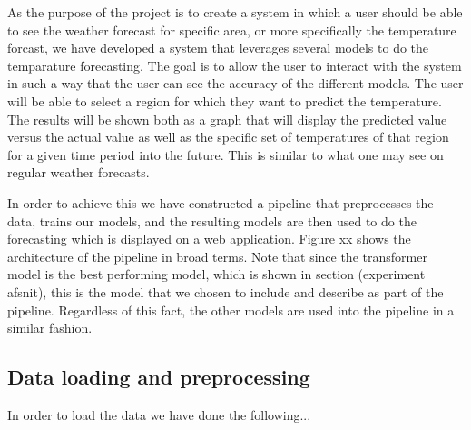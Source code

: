 As the purpose of the project is to create a system in which a user should be able to see the weather forecast for specific area, or more specifically the temperature forcast, we have developed a system that leverages several models to do the temparature forecasting. 
The goal is to allow the user to interact with the system in such a way that the user can see the accuracy of the different models. 
The user will be able to select a region for which they want to predict the temperature. The results will be shown both as a graph that will display the predicted value versus the actual value as well as the specific set of temperatures of that region for a given time period into the future. This is similar to what one may see on regular weather forecasts.

In order to achieve this we have constructed a pipeline that preprocesses the data, trains our models, and the resulting models are then used to do the forecasting which is displayed on a web application. 
Figure xx shows the architecture of the pipeline in broad terms. 
Note that since the transformer model is the best performing model, which is shown in section (experiment afsnit), this is the model that we chosen to include and describe as part of the pipeline. Regardless of this fact, the other models are used into the pipeline in a similar fashion.

\subsection{Data loading and preprocessing}
In order to load the data we have done the following...